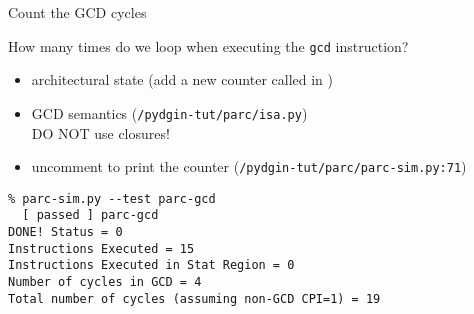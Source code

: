 
\begin{task}
\begin{frame}[fragile]{Count the GCD cycles}

{}How many times do we loop when executing the \texttt{gcd} instruction?

\begin{itemize}
  \item architectural state (add a new counter called  in
  )
  \item GCD semantics (\texttt{\midtilde/pydgin-tut/parc/isa.py})\\
   DO NOT use closures!
  \item uncomment to print the counter
  (\texttt{\midtilde/pydgin-tut/parc/parc-sim.py:71})
\end{itemize}

\begin{Verbatim}[fontsize=\small,commandchars=\\\{\}]
% cd \midtilde/pydgin-tut/parc/asm_tests/build
% parc-sim.py --test parc-gcd
  [ passed ] parc-gcd
DONE! Status = 0
Instructions Executed = 15
Instructions Executed in Stat Region = 0
Number of cycles in GCD = 4
Total number of cycles (assuming non-GCD CPI=1) = 19
\end{Verbatim}

\end{frame}
\end{task}


